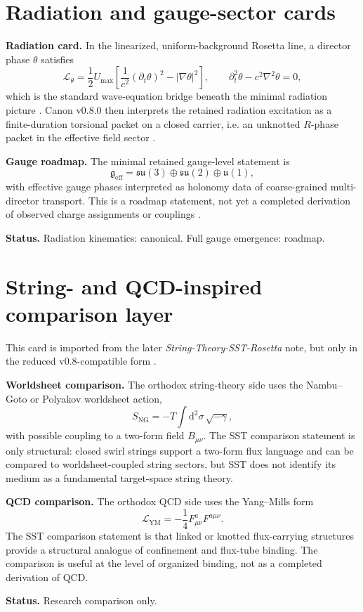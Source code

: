 \documentclass[11pt,a4paper]{article}
\newcommand{\Umax}{U_{\max}}
\newcommand{\Geff}{\mathfrak g_{\mathrm{eff}}}
\newcommand{\dd}{\mathrm d}
\newcommand{\RosettaCard}[1]{\begin{tcolorbox}[colback=blue!4,colframe=blue!60!black,boxrule=0.6pt,arc=3pt,title={#1}]}
\newcommand{\EndRosettaCard}{\end{tcolorbox}}
\begin{document}
\section{Radiation and gauge-sector cards}
\RosettaCard{Rosetta Card 6: radiation bridge and minimal gauge roadmap}
\textbf{Radiation card.} In the linearized, uniform-background Rosetta line, a director phase \(\theta\) satisfies
\[
\mathcal L_{\theta}=\frac12\Umax\left[\frac{1}{c^2}(\partial_t\theta)^2-|\nabla\theta|^2\right],
\qquad
\partial_t^2\theta-c^2\nabla^2\theta=0,
\]
which is the standard wave-equation bridge beneath the minimal radiation picture \cite{Rosetta06}. Canon v0.8.0 then interprets the retained radiation excitation as a finite-duration torsional packet on a closed carrier, i.e. an unknotted \(R\)-phase packet in the effective field sector \cite{SSTCanon08}.\par
\medskip
\textbf{Gauge roadmap.} The minimal retained gauge-level statement is
\[
\Geff = \mathfrak{su}(3)\oplus \mathfrak{su}(2)\oplus \mathfrak{u}(1),
\]
with effective gauge phases interpreted as holonomy data of coarse-grained multi-director transport. This is a roadmap statement, not yet a completed derivation of observed charge assignments or couplings \cite{SSTCanon08}.\par
\medskip
\textbf{Status.} Radiation kinematics: canonical. Full gauge emergence: roadmap.
\EndRosettaCard

\section{String- and QCD-inspired comparison layer}
\RosettaCard{Rosetta Card 7: string/QCD comparison layer (research use only)}
This card is imported from the later \emph{String-Theory-SST-Rosetta} note, but only in the reduced v0.8-compatible form \cite{StringRosetta}.\par
\medskip
\textbf{Worldsheet comparison.} The orthodox string-theory side uses the Nambu--Goto or Polyakov worldsheet action,
\[
S_{\mathrm{NG}}=-T\int \dd^2\sigma\,\sqrt{-\gamma},
\]
with possible coupling to a two-form field \(B_{\mu\nu}\). The SST comparison statement is only structural: closed swirl strings support a two-form flux language and can be compared to worldsheet-coupled string sectors, but SST does not identify its medium as a fundamental target-space string theory.\par
\medskip
\textbf{QCD comparison.} The orthodox QCD side uses the Yang--Mills form
\[
\mathcal L_{\mathrm{YM}}=-\frac14 F^a_{\mu\nu}F^{a\mu\nu}.
\]
The SST comparison statement is that linked or knotted flux-carrying structures provide a structural analogue of confinement and flux-tube binding. The comparison is useful at the level of organized binding, not as a completed derivation of QCD.\par
\medskip
\textbf{Status.} Research comparison only.
\EndRosettaCard
\end{document}
